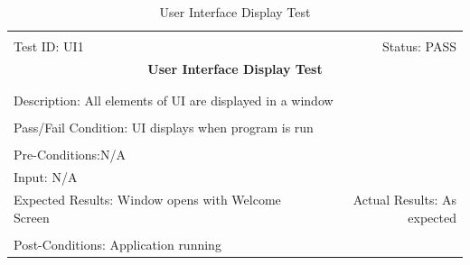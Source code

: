 \documentclass[11pt]{article}
\begin{document}
\begin{center}
\begin{table}[H]
\begin{tabular}{|l r|}\hline&\\[-2mm]
	Test ID: UI1	&Status: PASS \\[-3mm]
	\multicolumn{2}{|c|}{\textbf{\large{User Interface Display Test}}}\\&\\\hline&\\[-3mm]
	\multicolumn{2}{|p{\textwidth}|}{Description: All elements of UI are displayed in a window}\\[1mm]\hline&\\[-3mm]
	\multicolumn{2}{|p{\textwidth}|}{Pass/Fail Condition: UI displays when program is run}\\[1mm]\hline&\\[-3mm]
	\multicolumn{2}{|p{\textwidth}|}{Pre-Conditions:N/A}\\[4mm]
	\multicolumn{2}{|p{\textwidth}|}{Input: N/A}\\[2mm]\hline
	\multicolumn{1}{|p{0.49\textwidth}}{Expected Results: Window opens with Welcome Screen}	&\multicolumn{1}{|p{0.45\textwidth}|}{Actual Results: As expected}\\\hline&\\[-3mm]
	\multicolumn{2}{|p{\textwidth}|}{Post-Conditions: Application running}\\\hline
\end{tabular}
\caption{User Interface Display Test}
\end{table}
\end{center}
\end{document}
